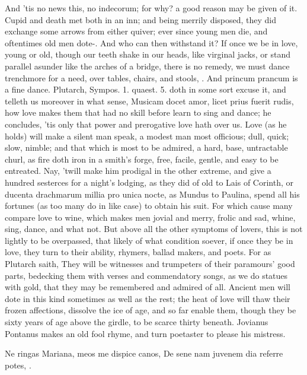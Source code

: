 And 'tis no news this, no indecorum; for why? a good reason may be
given of it. Cupid and death met both in an inn; and being merrily
disposed, they did exchange some arrows from either quiver; ever since
young men die, and oftentimes old men dote-. And who can then withstand it? If once we be in
love, young or old, though our teeth shake in our heads, like virginal
jacks, or stand parallel asunder like the arches of a bridge, there is
no remedy, we must dance trenchmore for a need, over tables, chairs,
and stools, \etc{}. And princum prancum is a fine dance. Plutarch, Sympos.
1. quaest. 5. doth in some sort excuse it, and telleth us moreover in
what sense, Musicam docet amor, licet prius fuerit rudis, how love
makes them that had no skill before learn to sing and dance; he
concludes, 'tis only that power and prerogative love hath over us.
Love (as he holds) will make a silent man speak, a modest man
most officious; dull, quick; slow, nimble; and that which is most to be
admired, a hard, base, untractable churl, as fire doth iron in a
smith's forge, free, facile, gentle, and easy to be entreated. Nay,
'twill make him prodigal in the other extreme, and give a hundred
sesterces for a night's lodging, as they did of old to Lais of Corinth,
or  ducenta drachmarum millia pro unica nocte, as Mundus to
Paulina, spend all his fortunes (as too many do in like case) to obtain
his suit. For which cause many compare love to wine, which makes men
jovial and merry, frolic and sad, whine, sing, dance, and what not.
But above all the other symptoms of lovers, this is not lightly to be
overpassed, that likely of what condition soever, if once they be in
love, they turn to their ability, rhymers, ballad makers, and poets.
For as Plutarch saith, They will be witnesses and trumpeters of
their paramours' good parts, bedecking them with verses and
commendatory songs, as we do statues with gold, that they may be
remembered and admired of all. Ancient men will dote in this kind
sometimes as well as the rest; the heat of love will thaw their frozen
affections, dissolve the ice of age, and so far enable them, though
they be sixty years of age above the girdle, to be scarce thirty
beneath. Jovianus Pontanus makes an old fool rhyme, and turn poetaster
to please his mistress.

Ne ringas Mariana, meos me dispice canos,
De sene nam juvenem dia referre potes, \etc{}.

